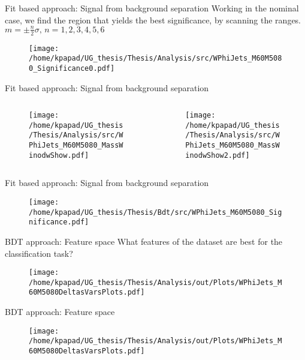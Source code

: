 \documentclass[bigger]{beamer}
\begin{document}
\begin{frame}[label={sec:org280ef13}]{Fit based approach: Signal from background separation}
Working in the nominal case, we find the region that yields the best significance, by scanning the ranges. \(m=\pm \frac{n}{2}\sigma\text{, }n=1, 2, 3, 4, 5, 6\) 
\begin{figure}[h]
\centering
\texttt{[image: /home/kpapad/UG\_thesis/Thesis/Analysis/src/WPhiJets\_M60M5080\_Significance0.pdf]}
\end{figure}
\end{frame}
\begin{frame}[label={sec:orgfbf0dda}]{Fit based approach: Signal from background separation}
\begin{columns}
\begin{column}{0.5\columnwidth}
\begin{figure}[h]
\centering
\texttt{[image: /home/kpapad/UG\_thesis/Thesis/Analysis/src/WPhiJets\_M60M5080\_MassWinodwShow.pdf]}
\end{figure}
\end{column}
\begin{column}{0.5\columnwidth}
\begin{figure}[h]
\centering
\texttt{[image: /home/kpapad/UG\_thesis/Thesis/Analysis/src/WPhiJets\_M60M5080\_MassWinodwShow2.pdf]}
\end{figure}
\end{column}
\end{columns}
\end{frame}
\begin{frame}[label={sec:org113fb2a}]{Fit based approach: Signal from background separation}
\begin{figure}[h]
\centering
\texttt{[image: /home/kpapad/UG\_thesis/Thesis/Bdt/src/WPhiJets\_M60M5080\_Significance.pdf]}
\end{figure}
\end{frame}
\begin{frame}[label={sec:org85ebbd8}]{BDT approach: Feature space}
\alert{What features of the dataset are best for the classification task?}
\begin{figure}[h!]
\centering
\texttt{[image: /home/kpapad/UG\_thesis/Thesis/Analysis/out/Plots/WPhiJets\_M60M5080DeltasVarsPlots.pdf]}
\end{figure}
\end{frame}
\begin{frame}[label={sec:orgfbef1ad}]{BDT approach: Feature space}
\begin{figure}[h!]
\centering
\texttt{[image: /home/kpapad/UG\_thesis/Thesis/Analysis/out/Plots/WPhiJets\_M60M5080DeltasVarsPlots.pdf]}
\end{figure}
\end{frame}
\end{document}
